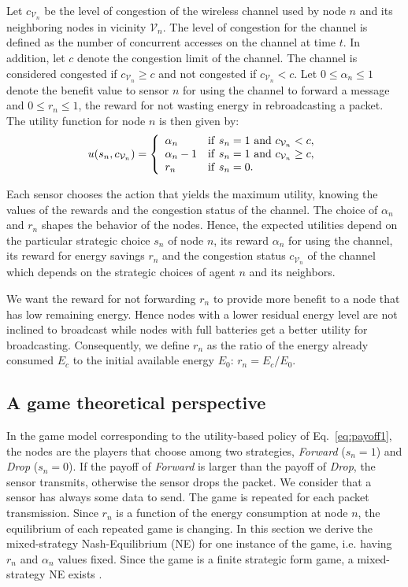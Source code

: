 \documentclass[journal, peerreview, onecolumn, draftcls]{IEEEtran}
\begin{document}
Let $c_{\mathcal{V}_n}$ be the level of congestion of the wireless channel used by node $n$ and its neighboring nodes in vicinity $\mathcal{V}_n$. The level of congestion for the channel is defined as the number of concurrent accesses on the channel at time $t$.
In addition, let $c$ denote the congestion limit of the channel. The channel is considered congested if $c_{\mathcal{V}_n} \geq c$ and not congested if $c_{\mathcal{V}_n} < c$. Let $0 \leq \alpha_n \leq 1$ denote the benefit value to sensor $n$ for using the channel to forward a message and $0 \leq r_n \leq 1$, the reward for not wasting energy in rebroadcasting a packet. The utility function for node $n$ is then given by:
\begin{equation}
u(s_n , c_{\mathcal{V}_n}) = \left\{
    \begin{array}{l l}
		\alpha_n 	    & {\rm if}~s_n = 1~{\rm and}~c_{\mathcal{V}_n}< c,\\
        \alpha_n - 1	& {\rm if}~s_n = 1~{\rm and}~c_{\mathcal{V}_n}\geq c,\\
  		r_n 	        & {\rm if}~s_n = 0.\\
    \end{array}
\right.
\label{eq:payoff1}
\end{equation}

Each sensor chooses the action that yields the maximum utility, knowing the values of the rewards and the congestion status of the channel. The choice of $\alpha_n$ and $r_n$ shapes the behavior of the nodes. Hence, the expected utilities depend on the particular strategic choice $s_n$ of node $n$, its reward $\alpha_n$ for using the channel, its reward for energy savings $r_n$ and the congestion status $c_{\mathcal{V}_n}$ of the channel which depends on the strategic choices of agent $n$ and its neighbors.

We want the reward for not forwarding $r_n$ to provide more benefit to a node that has low remaining energy. Hence nodes with a lower residual energy level are not inclined to broadcast while nodes with full batteries get a better utility for broadcasting.
Consequently, we define $r_n$ as the ratio of the energy already consumed $E_c$ to the initial available energy $E_0$: $r_n = E_c/E_0$.

\subsection{A game theoretical perspective}

In the game model corresponding to the utility-based policy of Eq.~\eqref{eq:payoff1}, the nodes are the players that choose among two strategies, {\it Forward} ($s_n=1$) and {\it Drop} ($s_n=0$). If the payoff of {\it Forward} is larger than the payoff of {\it Drop}, the sensor transmits, otherwise the sensor drops the packet. We consider that a sensor has always some data to send. The game is repeated for each packet transmission. Since $r_n$ is a function of the energy consumption at node $n$, the equilibrium of each repeated game is changing.
In this section we derive the mixed-strategy Nash-Equilibrium (NE) for one instance of the game, i.e. having $r_n$ and $\alpha_n$ values fixed. Since the game is a finite strategic form game, a mixed-strategy NE exists \cite{gametheory}.
\end{document}
